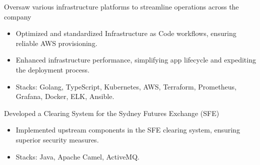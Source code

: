\documentclass{resume}
\begin{document}
Oversaw various infrastructure platforms to streamline operations across the company
\begin{itemize}
  \item Optimized and standardized Infrastructure as Code workflows, ensuring reliable AWS provisioning.
  \item Enhanced infrastructure performance, simplifying app lifecycle and expediting the deployment process.
  \item Stacks: Golang, TypeScript, Kubernetes, AWS, Terraform, Prometheus, Grafana, Docker, ELK, Ansible.
\end{itemize}


Developed a Clearing System for the Sydney Futures Exchange (SFE)
\begin{itemize}
  \item Implemented upstream components in the SFE clearing system, ensuring superior security measures.
  \item Stacks: Java, Apache Camel, ActiveMQ.
\end{itemize}
\end{document}
